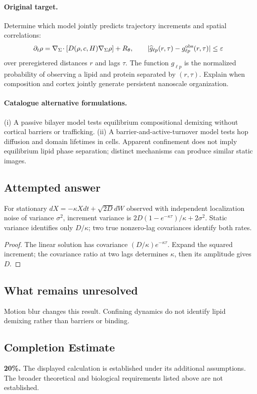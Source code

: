 \documentclass[11pt]{article}
\begin{document}
\paragraph{Original target.}
Determine which model jointly predicts trajectory increments and spatial correlations:
\[
\partial_t\rho=\nabla_\Sigma\!\cdot[D(\rho,c,H)\nabla_\Sigma\rho]+R_\theta,
\qquad |\widehat g_{\ell p}(r,\tau)-g^{\rm obs}_{\ell p}(r,\tau)|\leq\varepsilon
\]
over preregistered distances $r$ and lags $\tau$. The function $g_{\ell p}$ is the normalized probability of observing a lipid and protein separated by $(r,\tau)$. Explain when composition and cortex jointly generate persistent nanoscale organization.
\paragraph{Catalogue alternative formulations.}
(i) A passive bilayer model tests equilibrium compositional demixing without cortical barriers or trafficking. (ii) A barrier-and-active-turnover model tests hop diffusion and domain lifetimes in cells. Apparent confinement does not imply equilibrium lipid phase separation; distinct mechanisms can produce similar static images.
\subsection{Attempted answer}
\begin{proposition}
For stationary $dX=-\kappa Xdt+\sqrt{2D}dW$ observed with independent localization noise of variance $\sigma^2$, increment variance is $2D(1-e^{-\kappa\tau})/\kappa+2\sigma^2$. Static variance identifies only $D/\kappa$; two true nonzero-lag covariances identify both rates.
\end{proposition}
\begin{proof}
The linear solution has covariance $(D/\kappa)e^{-\kappa\tau}$. Expand the squared increment; the covariance ratio at two lags determines $\kappa$, then its amplitude gives $D$.
\end{proof}
\subsection{What remains unresolved}
Motion blur changes this result. Confining dynamics do not identify lipid demixing rather than barriers or binding.
\subsection{Completion Estimate}
\textbf{20\%.} The displayed calculation is established under its additional assumptions. The broader theoretical and biological requirements listed above are not established.
\end{document}
